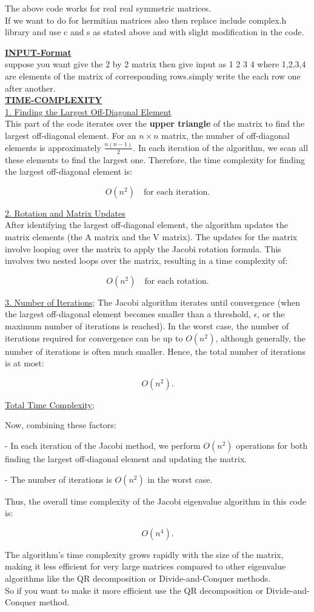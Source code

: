 \documentclass[journal]{IEEEtran}
\begin{document}
The above code works for real real symmetric matrices.\\
If we want to do for hermitian matrices also then replace include complex.h library and use c and s as stated above and with slight modification in the code.

\underline{\textbf{INPUT-Format}}\\
suppose you want give the 2 by 2 matrix then give input as 1 2 3 4 where 1,2,3,4 are elements of the matrix of corresponding rows.simply write the each row one after another.\\
\underline{\textbf{TIME-COMPLEXITY}}\\

\underline{1. Finding the Largest Off-Diagonal Element}\\
This part of the code iterates over the \textbf{upper triangle} of the matrix to find the largest off-diagonal element. For an \( n \times n \) matrix, the number of off-diagonal elements is approximately \( \frac{n(n-1)}{2} \). In each iteration of the algorithm, we scan all these elements to find the largest one. Therefore, the time complexity for finding the largest off-diagonal element is:

\[
O(n^2) \quad \text{for each iteration}.
\]

\underline{2. Rotation and Matrix Updates}\\
After identifying the largest off-diagonal element, the algorithm updates the matrix elements (the A matrix and the V matrix). The updates for the matrix involve looping over the matrix to apply the Jacobi rotation formula. This involves two nested loops over the matrix, resulting in a time complexity of:

\[
O(n^2) \quad \text{for each rotation}.
\]

\underline{3. Number of Iterations};
The Jacobi algorithm iterates until convergence (when the largest off-diagonal element becomes smaller than a threshold, \( \epsilon \), or the maximum number of iterations is reached). In the worst case, the number of iterations required for convergence can be up to \( O(n^2) \), although generally, the number of iterations is often much smaller. Hence, the total number of iterations is at most:

\[
O(n^2).
\]

\underline{Total Time Complexity};

Now, combining these factors:

- In each iteration of the Jacobi method, we perform \( O(n^2) \) operations for both finding the largest off-diagonal element and updating the matrix.

- The number of iterations is \( O(n^2) \) in the worst case.

Thus, the overall time complexity of the Jacobi eigenvalue algorithm in this code is:

\[
O(n^4).
\]

The algorithm's time complexity grows rapidly with the size of the matrix, making it less efficient for very large matrices compared to other eigenvalue algorithms like the QR decomposition or Divide-and-Conquer methods.\\So if you want to make it more efficient use the QR decomposition or Divide-and-Conquer method.
\end{document}
